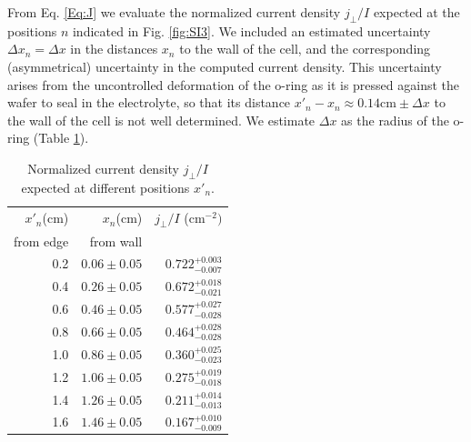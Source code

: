 \documentclass[review,sort&compress]{cas-sc}
\begin{document}
From Eq. \eqref{Eq:J} we evaluate the
normalized current density $j_\perp/I$ expected at the positions $n$ indicated in
Fig. \ref{fig:SI3}. We included an estimated uncertainty $\Delta
  x_n=\Delta x$ in the
distances $x_n$ to the wall of the cell, and the corresponding (asymmetrical)
uncertainty in the computed current density. This
uncertainty arises from the uncontrolled deformation of the o-ring as
it is pressed against the wafer to seal in the electrolyte, so that
its distance $x'_n-x_n\approx 0.14\text{cm}\pm\Delta x$ to the wall of
the cell is not well determined. We estimate $\Delta x$
as the radius of the o-ring (Table \ref{t:xj}).
\begin{table}
  \centering
  \renewcommand{\arraystretch}{1.1}
    \begin{tabular}{rrr}
     $x'_n$(cm) &$x_n$(cm)&$j_\perp/I$ ($\text{cm}^{-2})$\\
     from edge& from wall&\\
     \hline
     0.2 &$ 0.06\pm0.05$ & $0.722^{+0.003}_{-0.007}$\\
     0.4 &$ 0.26\pm0.05$ & $0.672^{+0.018}_{-0.021}$\\
     0.6 &$ 0.46\pm0.05$ & $0.577^{+0.027}_{-0.028}$\\
     0.8 &$ 0.66\pm0.05$ & $0.464^{+0.028}_{-0.028}$\\
     1.0 &$ 0.86\pm0.05$ & $0.360^{+0.025}_{-0.023}$\\
     1.2 &$ 1.06\pm0.05$ & $0.275^{+0.019}_{-0.018}$\\
     1.4 &$ 1.26\pm0.05$ & $0.211^{+0.014}_{-0.013}$\\
     1.6 &$ 1.46\pm0.05$ & $0.167^{+0.010}_{-0.009}$\\
    \end{tabular}
  \caption{Normalized current density $j_\perp/I$ expected at different positions $x'_n$.}
  \label{t:xj}
\end{table}
\end{document}
